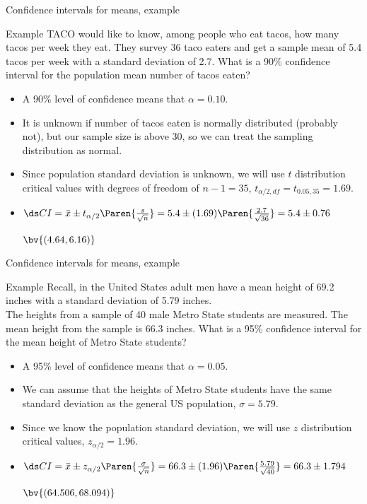 \documentclass[xcolor=table]{beamer}
\begin{document}
\begin{frame}{Confidence intervals for means, example}
\begin{exampleblock}{Example}
TACO would like to know, among people who eat tacos, how many tacos per week they eat. They survey 36 taco eaters and get a sample mean of 5.4 tacos per week with a standard deviation of 2.7. What is a 90\% confidence interval for the population mean number of tacos eaten?
\begin{itemize}
\pause\item A 90\% level of confidence means that $\alpha = 0.10$.
\pause\item It is unknown if number of tacos eaten is normally distributed (probably not), but our sample size is above 30, so we can treat the sampling distribution as normal.
\pause\item Since population standard deviation is unknown, we will use $t$ distribution critical values with degrees of freedom of $n-1=35$, $t_{\alpha/2, df}= t_{0.05,35} = 1.69$.
\pause\item $\ds CI = \bar x \pm t_{\alpha/2}\Paren{\frac s {\sqrt{n}}} = 5.4 \pm (1.69) \Paren{\frac {2.7}{\sqrt{36}}} = 5.4 \pm 0.76$\\
\pause\smallskip
{\large $\bv{(4.64, 6.16)}$ \par}
\end{itemize}
\end{exampleblock}
\end{frame}

\begin{frame}{Confidence intervals for means, example}
\begin{exampleblock}{Example}
Recall, in the United States adult men have a mean height of 69.2 inches with a standard deviation of 5.79 inches.\\
\medskip
The heights from a sample of 40 male Metro State students are measured. The mean height from the sample is 66.3 inches. What is a 95\% confidence interval for the mean height of Metro State students?
\begin{itemize}
\pause\item A 95\% level of confidence means that $\alpha = 0.05$.
\pause\item We can assume that the heights of Metro State students have the same standard deviation as the general US population, $\sigma = 5.79$.
\pause\item Since we know the population standard deviation, we will use $z$ distribution critical values, $z_{\alpha/2} = 1.96$.
\pause\item $\ds CI = \bar x \pm z_{\alpha/2}\Paren{\frac \sigma {\sqrt{n}}} = 66.3 \pm (1.96) \Paren{\frac {5.79}{\sqrt{40}}} = 66.3 \pm 1.794$\\
\pause\smallskip
{\large $\bv{(64.506, 68.094)}$ \par}
\end{itemize}
\end{exampleblock}
\end{frame}
\end{document}
